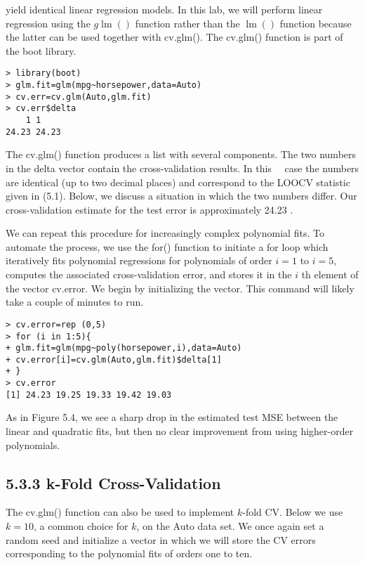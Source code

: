 \documentclass[10pt]{article}
\begin{document}
yield identical linear regression models. In this lab, we will perform linear regression using the $g \operatorname{lm}()$ function rather than the $\operatorname{lm}()$ function because the latter can be used together with cv.glm(). The cv.glm() function is part of the boot library.

\begin{verbatim}
> library(boot)
> glm.fit=glm(mpg~horsepower,data=Auto)
> cv.err=cv.glm(Auto,glm.fit)
> cv.err$delta
    1 1
24.23 24.23
\end{verbatim}

The cv.glm() function produces a list with several components. The two numbers in the delta vector contain the cross-validation results. In this\
\
case the numbers are identical (up to two decimal places) and correspond to the LOOCV statistic given in (5.1). Below, we discuss a situation in which the two numbers differ. Our cross-validation estimate for the test error is approximately 24.23 .

We can repeat this procedure for increasingly complex polynomial fits. To automate the process, we use the for() function to initiate a for loop which iteratively fits polynomial regressions for polynomials of order $i=1$ to $i=5$, computes the associated cross-validation error, and stores it in the $i$ th element of the vector cv.error. We begin by initializing the vector. This command will likely take a couple of minutes to run.

\begin{verbatim}
> cv.error=rep (0,5)
> for (i in 1:5){
+ glm.fit=glm(mpg~poly(horsepower,i),data=Auto)
+ cv.error[i]=cv.glm(Auto,glm.fit)$delta[1]
+ }
> cv.error
[1] 24.23 19.25 19.33 19.42 19.03
\end{verbatim}

As in Figure 5.4, we see a sharp drop in the estimated test MSE between the linear and quadratic fits, but then no clear improvement from using higher-order polynomials.

\subsection*{5.3.3 k-Fold Cross-Validation}
The cv.glm() function can also be used to implement $k$-fold CV. Below we use $k=10$, a common choice for $k$, on the Auto data set. We once again set a random seed and initialize a vector in which we will store the CV errors corresponding to the polynomial fits of orders one to ten.
\end{document}
